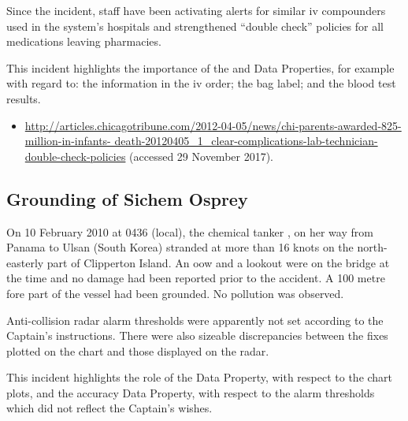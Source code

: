 Since the incident, staff have been activating alerts for similar \gls{iv} compounders used in the system's hospitals and strengthened ``double check'' policies for all medications leaving pharmacies.

This incident highlights the importance of the  and  Data Properties, for example with regard to: the information in the \gls{iv} order; the bag label; and the blood test results.

\begin{samepage}
\begin{itemize}
  \item \raggedright{\href{http://articles.chicagotribune.com/2012-04-05/news/chi-parents-awarded-825-million-in-infants-death-20120405_1_clear-complications-lab-technician-double-check-policies}{http://articles.chicagotribune.com/2012-04-05/news/chi-parents-awarded-825-million-in-infants- death-20120405\_1\_clear-complications-lab-technician-double-check-policies} (accessed 29 November 2017).}
\end{itemize}
\end{samepage}


\subsection{Grounding of Sichem Osprey} \label{bkm:incacc:sichemosprey}
On 10 February 2010 at 0436 (local), the chemical tanker , on her way from Panama to Ulsan (South Korea) stranded at more than 16 knots on the north-easterly part of Clipperton Island. An \gls{oow} and a lookout were on the bridge at the time and no damage had been reported prior to the accident. A 100 metre fore part of the vessel had been grounded. No pollution was observed.

Anti-collision radar alarm thresholds were apparently not set according to the Captain's instructions. There were also sizeable discrepancies between the fixes plotted on the chart and those displayed on the radar.

This incident highlights the role of the  Data Property, with respect to the chart plots, and the \gls{accuracy} Data Property, with respect to the alarm thresholds which did not reflect the Captain's wishes.

